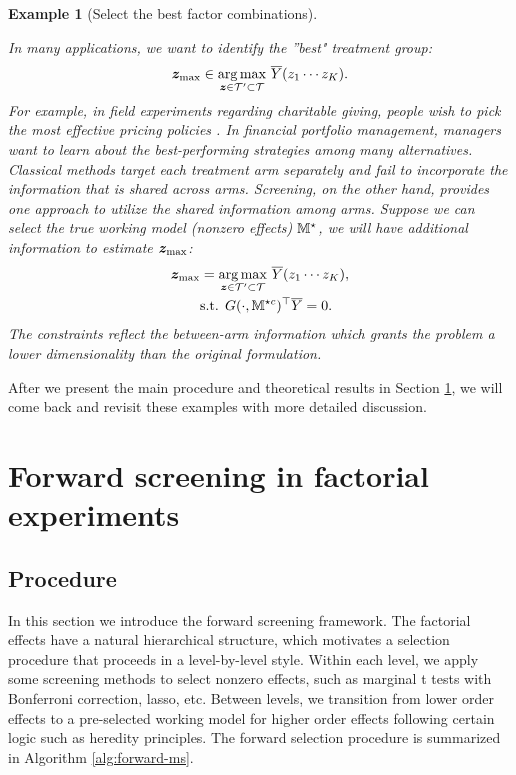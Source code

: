 \documentclass[12pt]{article}
\newtheorem{example}{Example}
\begin{document}
\begin{example}[Select the best factor combinations]\label{exp:select-best}

In many applications, we want to identify the ''best" treatment group:
\begin{align}\label{eqn:hat-bz}
    {{\boldsymbol{z}}_{\max}} \in \underset{{\boldsymbol{z}}\in{\mathcal{T}}'\subset{\mathcal{T}}}{\arg\max}~ \overline{Y}(z_1\cdots z_K).
\end{align}
For example, in field experiments regarding charitable giving, people wish to pick the most effective pricing policies \citep{karlan2007does, wei2022inference}. In financial portfolio management, managers  want to learn about the
best-performing strategies among many alternatives. Classical methods target each treatment arm separately and fail to incorporate the information that is shared across arms.   Screening, on the other hand, provides one approach to utilize the shared information among arms. Suppose we can select the true working model (nonzero effects) ${\mathbb{M}}^\star$, we will have additional information to estimate ${{\boldsymbol{z}}_{\max}}$:
\begin{align}\label{eqn:hat-bz-general}
    {{\boldsymbol{z}}_{\max}} &= \underset{{\boldsymbol{z}}\in{\mathcal{T}}'\subset{\mathcal{T}}}{\arg\max}~ \overline{Y}(z_1\cdots z_K), \\
    &\text{s.t. }  G(\cdot,{{\mathbb{M}}^{\star c}})^\top \overline{Y} = 0. \notag
\end{align}
The constraints reflect the between-arm information which grants the problem a lower dimensionality than the original formulation. 
\end{example}



After we present the main procedure and theoretical results in Section \ref{sec:forward-framework}, we will come back and revisit these examples with more detailed discussion.

\section{Forward screening in factorial experiments} \label{sec:forward-framework}

\subsection{Procedure}

In this section we introduce the forward screening framework. The factorial effects have a natural hierarchical structure, which motivates a selection procedure that proceeds in a level-by-level style. Within each level, we apply some  screening methods to select nonzero effects, such as marginal t tests with Bonferroni correction, lasso, etc. Between levels, we transition from lower order effects to a pre-selected working model for higher order effects following certain logic such as heredity principles. The forward selection procedure is summarized in Algorithm \ref{alg:forward-ms}.
\end{document}
